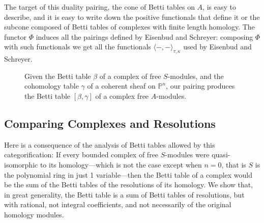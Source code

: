 \documentclass[12pt]{amsart}
\theoremstyle{definition}
\theoremstyle{remark}
\newcommand{\PP}{\mathbb{P}}
\newcommand{\CQ}{\mathrm{C}}
\newcommand{\BBQ}{\underline{\mathrm{B}}}
\begin{document}
The target of this duality pairing, the cone of Betti tables on $A$, is easy to describe, and it is easy to write down the positive functionals that define it or the subcone composed of Betti tables of complexes with finite length homology. 
The functor $\Phi$ induces all the pairings defined by Eisenbud and Schreyer: composing $\Phi$ with such functionals we get all the functionals $\langle -,-\rangle_{\tau,\kappa}$ used by Eisenbud and Schreyer.
\begin{figure}
\caption{Given the Betti table $\beta$ of a complex of free $S$-modules, and the cohomology table $\gamma$ of a coherent sheaf on $\PP^n$, our pairing produces the Betti table $[\beta, \gamma]$ of a complex free $A$-modules.
}
\label{fig:bracket}
\end{figure}

\subsection*{Comparing Complexes and Resolutions} Here is a consequence of the analysis of Betti tables allowed by this categorification: If every bounded complex of free $S$-modules were quasi-isomorphic to its homology---which is not the case except when $n=0$, that is $S$ is the polynomial ring in just 1 variable---then the Betti table of a complex would be the sum of the Betti tables of the resolutions of its homology.  We show that, in great generality, the Betti table is  a sum of Betti tables of resolutions, but with rational, not integral coefficients, and not necessarily of the original homology modules. 
\end{document}
